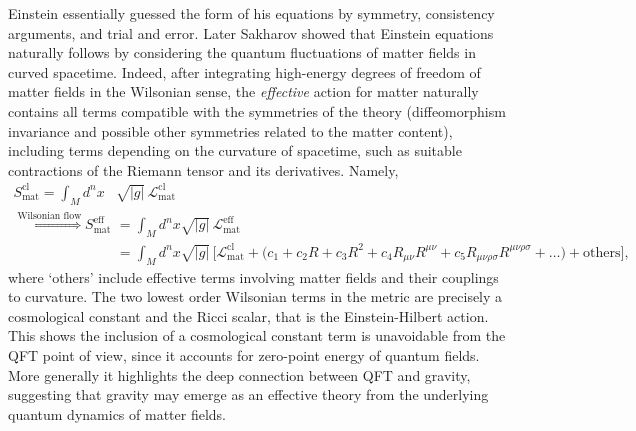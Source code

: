 \documentclass[../geometry_main.tex]{subfiles}
\begin{document}
\begin{mytheorem}
%
Einstein essentially guessed the form of his equations by symmetry, consistency arguments, and trial and error.
Later Sakharov showed that Einstein equations naturally follows by considering the quantum fluctuations of matter fields in curved spacetime.
%
Indeed, after integrating high-energy degrees of freedom of matter fields in the Wilsonian sense, the \emph{effective} action for matter naturally contains all terms compatible with the symmetries of the theory (diffeomorphism invariance and possible other symmetries related to the matter content), including terms depending on the curvature of spacetime, such as suitable contractions of the Riemann tensor and its derivatives.
Namely,
{\small
\begin{align}
    S_{\mathrm{mat}}^{\mathrm{cl}}= \int_M\!\!d^nx&\sqrt{|g|}\,\mathcal{L}_{\mathrm{mat}}^{\mathrm{cl}}
    \\
        \overset{\text{Wilsonian flow}}{\Longrightarrow}
    S_{\mathrm{mat}}^{\mathrm{eff}}&= \int_M\!\!d^nx\sqrt{|g|}\,\mathcal{L}_{\mathrm{mat}}^{\mathrm{eff}}
    \\
    &= \int_M\!\!d^nx\sqrt{|g|}\,\bigg[\mathcal{L}_{\mathrm{mat}}^{\mathrm{cl}} + \Big( c_1 + c_2 R + c_3 R^2 + c_4 R_{\mu\nu}R^{\mu\nu} + c_5 R_{\mu\nu\rho\sigma}R^{\mu\nu\rho\sigma} + \ldots \Big) + \text{others}\bigg],
\end{align}
}
where `others' include effective terms involving matter fields and their couplings to curvature.
%
The two lowest order Wilsonian terms in the metric are precisely a cosmological constant and the Ricci scalar, that is the Einstein-Hilbert action.
This shows the inclusion of a cosmological constant term is unavoidable from the QFT point of view, since it accounts for zero-point energy of quantum fields.
More generally it highlights the deep connection between QFT and gravity, suggesting that gravity may emerge as an effective theory from the underlying quantum dynamics of matter fields.


\end{mytheorem}
\end{document}
